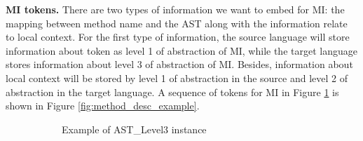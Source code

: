  \textbf{MI tokens.} There are two types of information we want to embed for MI: the mapping between method name and the AST along with the information relate to local context. For the first type of information, the source language will store information about token as level 1 of abstraction of MI, while the target language stores information about level 3 of abstraction of MI. Besides, information about local context will be stored by level 1 of abstraction in the source and level 2 of abstraction in the target language. A sequence of tokens for MI in Figure \ref{fig:mapping_expression} is shown in Figure \ref{fig:method_desc_example}.
 \noindent
\begin{figure}
    \centering
      \begin{subfigure}{0.3\textwidth}
        \caption{Example of AST\_Level3 instance}
        \label{fig:mapping_expression} 
      \end{subfigure}
      \hfill
      \begin{subfigure}[t]{0.3\textwidth}
\end{subfigure}
\end{figure}
